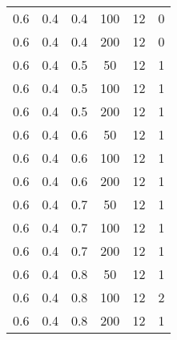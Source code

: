 \begin{table}[h]
\begin{center}
\begin{tabular}{|c|c|c|c|c|c|}
	0.6 &  0.4 &  0.4 &  100 &    12 &     0 \\
	0.6 &  0.4 &  0.4 &  200 &    12 &     0 \\
   \hline
	0.6 &  0.4 &  0.5 &   50 &    12 &     1 \\
	0.6 &  0.4 &  0.5 &  100 &    12 &     1 \\
	0.6 &  0.4 &  0.5 &  200 &    12 &     1 \\
   \hline
	0.6 &  0.4 &  0.6 &   50 &    12 &     1 \\
	0.6 &  0.4 &  0.6 &  100 &    12 &     1 \\
	0.6 &  0.4 &  0.6 &  200 &    12 &     1 \\
   \hline
	0.6 &  0.4 &  0.7 &   50 &    12 &     1 \\
	0.6 &  0.4 &  0.7 &  100 &    12 &     1 \\
	0.6 &  0.4 &  0.7 &  200 &    12 &     1 \\
   \hline
	0.6 &  0.4 &  0.8 &   50 &    12 &     1 \\
	0.6 &  0.4 &  0.8 &  100 &    12 &     2 \\
	0.6 &  0.4 &  0.8 &  200 &    12 &     1 \\
   \hline
    		\end{tabular}
	\end{center}
\end{table}
